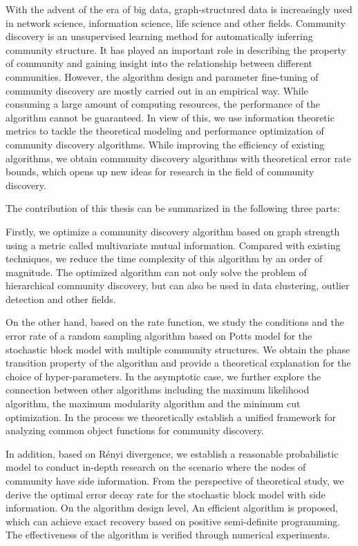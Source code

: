 \begin{abstract*}
  With the advent of the era of big data, graph-structured data is increasingly used in
  network science, information science, life science and other fields.
  Community discovery is an unsupervised learning method for automatically inferring community structure.
  It has played an important role in describing the property of community and gaining insight into the relationship between different communities.
  However, the algorithm design and parameter fine-tuning of community discovery are mostly carried out in an empirical way.
  While consuming a large amount of computing resources,
  the performance of the algorithm cannot be guaranteed.
  In view of this,
  we use information theoretic metrics to tackle the theoretical modeling and performance optimization of community discovery algorithms.
  While improving the efficiency of existing algorithms, we obtain community discovery algorithms with theoretical error rate bounds,
  which opens up new ideas for research in the field of community discovery.

  The contribution of this thesis can be summarized in the following three parts:

  Firstly, we optimize a community discovery algorithm based on graph strength using a metric called multivariate mutual information.
  Compared with existing techniques, we reduce the time complexity of this algorithm by an order of magnitude.
  The optimized algorithm can not only solve the problem of hierarchical community discovery, but can also be used in data clustering, outlier detection and other fields.

  On the other hand, based on the rate function,
  we study the conditions and the error rate of a random sampling algorithm based on Potts model
  for the stochastic block model with multiple community structures.
  We obtain the phase transition property of the algorithm and provide a theoretical explanation
  for the choice of hyper-parameters.
  In the asymptotic case, we further explore the connection between other algorithms including the maximum likelihood algorithm, the maximum modularity algorithm and the minimum cut optimization.
  In the process we theoretically establish a unified framework for analyzing common object functions for community discovery.

  In addition, based on Rényi divergence,
  we establish a reasonable probabilistic model
  to conduct in-depth research on the scenario
  where the nodes of community have side information.
  From the perspective of theoretical study,
  we derive the optimal error decay rate for the stochastic block model with side information.
  On the algorithm design level,
  An efficient algorithm is proposed, which can achieve exact recovery based on positive semi-definite programming.
  The effectiveness of the algorithm is verified through numerical experiments.


\end{abstract*}
